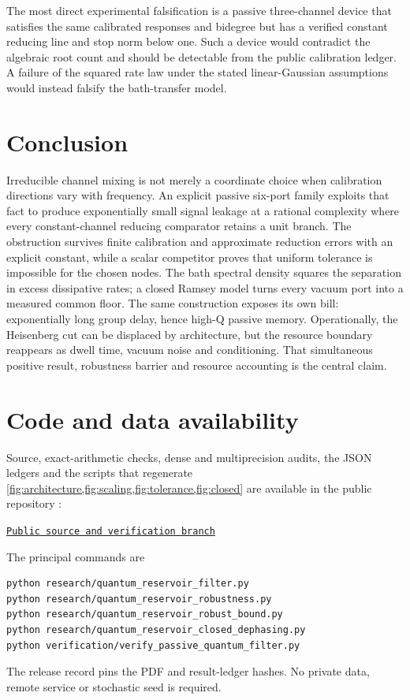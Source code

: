 \documentclass[11pt]{article}
\theoremstyle{definition}
\theoremstyle{remark}
\begin{document}
The most direct experimental falsification is a passive three-channel device
that satisfies the same calibrated responses and bidegree but has a verified
constant reducing line and stop norm below one.  Such a device would
contradict the algebraic root count and should be detectable from the public
calibration ledger.  A failure of the squared rate law under the stated
linear-Gaussian assumptions would instead falsify the bath-transfer model.

\section{Conclusion}

Irreducible channel mixing is not merely a coordinate choice when calibration
directions vary with frequency.  An explicit passive six-port family exploits
that fact to produce exponentially small signal leakage at a rational
complexity where every constant-channel reducing comparator retains a unit
branch.  The obstruction survives finite calibration and approximate
reduction errors with an explicit constant, while a scalar competitor proves
that uniform tolerance is impossible for the chosen nodes.  The bath spectral
density squares the separation in excess dissipative rates; a closed Ramsey
model turns every vacuum port into a measured common floor.  The same
construction exposes its own bill: exponentially long group delay, hence
high-Q passive memory.  Operationally, the Heisenberg cut can be displaced by
architecture, but the resource boundary reappears as dwell time, vacuum noise
and conditioning.  That simultaneous positive result, robustness barrier and
resource accounting is the central claim.

\section*{Code and data availability}

Source, exact-arithmetic checks, dense and multiprecision audits, the JSON
ledgers and the scripts that regenerate
\cref{fig:architecture,fig:scaling,fig:tolerance,fig:closed}
are available in the public
repository \cite{ErikssonRepository2026}:
\begin{center}
\href{https://github.com/lluiseriksson/finite-sample-spectral-certificates/tree/research/quantum-reservoir-boundary}{\texttt{Public source and verification branch}}
\end{center}
The principal commands are
\begin{verbatim}
python research/quantum_reservoir_filter.py
python research/quantum_reservoir_robustness.py
python research/quantum_reservoir_robust_bound.py
python research/quantum_reservoir_closed_dephasing.py
python verification/verify_passive_quantum_filter.py
\end{verbatim}
The release record pins the PDF and result-ledger hashes.  No private data,
remote service or stochastic seed is required.
\end{document}
